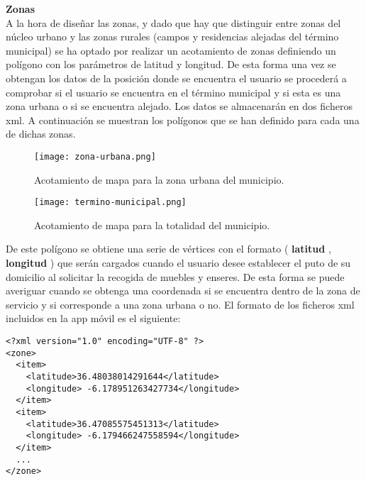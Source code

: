 \textbf{Zonas} \\
A la hora de diseñar las zonas, y dado que hay que distinguir entre zonas del núcleo urbano y las zonas rurales (campos y residencias alejadas del término municipal) se ha optado por realizar un acotamiento de zonas definiendo un polígono con los parámetros de latitud y longitud. De esta forma una vez se obtengan los datos de la posición donde se encuentra el usuario se procederá a comprobar si el usuario se encuentra en el término municipal y si esta es una zona urbana o si se encuentra alejado. Los datos se almacenarán en dos ficheros xml. A continuación se muestran los polígonos que se han definido para cada una de dichas zonas. 

\begin{figure}[H]
\centering
	\texttt{[image: zona-urbana.png]} 
\caption{Acotamiento de mapa para la zona urbana del municipio.}
\end{figure}	

\begin{figure}[H]
\centering
	\texttt{[image: termino-municipal.png]} 
\caption{Acotamiento de mapa para la totalidad del municipio.}
\end{figure}

De este polígono se obtiene una serie de vértices con el formato ( \textbf{latitud} , \textbf{longitud} ) que serán cargados cuando el usuario desee establecer el puto de su domicilio al solicitar la recogida de muebles y enseres. De esta forma se puede averiguar cuando se obtenga una coordenada si se encuentra dentro de la zona de servicio y si corresponde a una zona urbana o no. El formato de los ficheros xml incluidos en la app móvil es el siguiente:

\begin{lstlisting}[style=XML]
<?xml version="1.0" encoding="UTF-8" ?>
<zone>
  <item>
    <latitude>36.48038014291644</latitude>
    <longitude> -6.178951263427734</longitude>
  </item>
  <item>
    <latitude>36.47085575451313</latitude>
    <longitude> -6.179466247558594</longitude>
  </item>
  ...
</zone>
\end{lstlisting}
